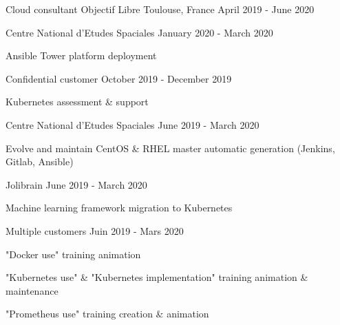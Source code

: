 \begin{cventries}
  \cventry
    {Cloud consultant} %
    {Objectif Libre} %
    {Toulouse, France} %
    {April 2019 - June 2020} %
    {
      \begin{cvsubentries}
        \cvsubentry
          {}
          {Centre National d'Etudes Spaciales}
          {January 2020 - March 2020}
          {
            \begin{cvitems} %
              \item {Ansible Tower platform deployment}
            \end{cvitems}
          }
        \cvsubentry
          {}
          {Confidential customer}
          {October 2019 - December 2019}
          {
            \begin{cvitems} %
              \item {Kubernetes assessment \& support}
            \end{cvitems}
          }
        \cvsubentry
          {}
          {Centre National d'Etudes Spaciales}
          {June 2019 - March 2020}
          {
            \begin{cvitems} %
              \item {Evolve and maintain CentOS \& RHEL master automatic generation (Jenkins, Gitlab, Ansible)}
            \end{cvitems}
          }
        \cvsubentry
          {}
          {Jolibrain}
          {June 2019 - March 2020}
          {
            \begin{cvitems} %
              \item {Machine learning framework migration to Kubernetes}
            \end{cvitems}
          }
        \cvsubentry
          {}
          {Multiple customers}
          {Juin 2019 - Mars 2020}
          {
            \begin{cvitems} %
              \item {"Docker use" training animation}
              \item {"Kubernetes use" \& "Kubernetes implementation" training animation \& maintenance}
              \item {"Prometheus use" training creation \& animation}
            \end{cvitems}
          }
      \end{cvsubentries}
    }
  

\end{cventries}
